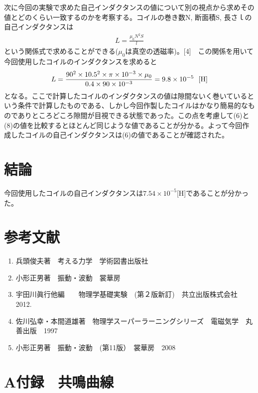 次に今回の実験で求めた自己インダクタンスの値について別の視点から求めその値とどのくらい一致するのかを考察する。コイルの巻き数N, 断面積S, 長さｌの自己インダクタンスは
\begin{eqnarray}
L=\frac{\mu_0 N^2 S}{l}
\end{eqnarray}
という関係式で求めることができる($\mu_0$は真空の透磁率)。[4]　この関係を用いて今回使用したコイルのインダクタンスを求めると
\begin{eqnarray}
L = \frac{90^2 \times 10.5^2 \times \pi \times 10^{-3}\times \mu_0 }{0.4 \times 90 \times 10^{-3}}= 9.8 \times 10^{-5}\ \ [{\rm H}]
\end{eqnarray}
となる。ここで計算したコイルのインダクタンスの値は隙間ないく巻いているという条件で計算したものである、しかし今回作製したコイルはかなり簡易的なものでありところどころ隙間が目視できる状態であった。この点を考慮して(6)と(8)の値を比較するとほとんど同じような値であることが分かる。よって今回作成したコイルの自己インダクタンスは(6)の値であることが確認された。













 \section{結論}
今回使用したコイルの自己インダクタンスは$7.54\times10^{-5}$[H]であることが分かった。

\section*{参考文献}
\begin{enumerate}
  \item	兵頭俊夫著　考える力学　学術図書出版社
  \item 小形正男著　振動・波動　裳華房
  \item 宇田川眞行他編　　物理学基礎実験　(第２版新訂)　共立出版株式会社　2012.
  \item 佐川弘幸・本間道雄著　物理学スーパーラーニングシリーズ　電磁気学　丸善出版　1997
  \item 小形正男著　振動・波動　(第11版）　裳華房　2008
\end{enumerate}

\section*{A付録　共鳴曲線}

